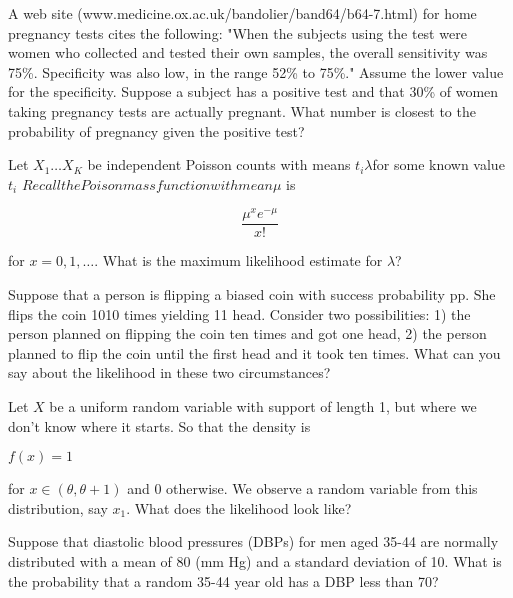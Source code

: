 \documentclass{homework}
\begin{document}
\begin{tcolorbox}[title=Question 3]
A web site (www.medicine.ox.ac.uk/bandolier/band64/b64-7.html) for home pregnancy tests cites the following: "When the subjects using the test were women who collected and tested their own samples, the overall sensitivity was 75\%. Specificity was also low, in the range 52\% to 75\%." Assume the lower value for the specificity. Suppose a subject has a positive test and that 30\% of women taking pregnancy tests are actually pregnant. What number is closest to the probability of pregnancy given the positive test?
\end{tcolorbox}

\begin{tcolorbox}[title=Question 4]
Let $X_1\ldots X_K$ be independent Poisson counts with means $t_i \lambda$for some known value $t_i$ $Recall the Poison mass function with mean \mu$ is

$$
 \frac{\mu^x e^{-\mu}}{x!}  
$$

for $x = 0,1,\ldots$. What is the maximum likelihood estimate for $\lambda$?
\end{tcolorbox}

\begin{tcolorbox}[title=Question 5]
Suppose that a person is flipping  a biased coin with success probability pp. She flips the coin 1010 times yielding 11 head. Consider two possibilities: 1) the person planned on flipping the coin ten times and got one head, 2) the person planned to flip the coin until the first head and it took ten times. What can you say about the likelihood in these two circumstances?
\end{tcolorbox}

\begin{tcolorbox}[title=Question 6]
Let $X$ be a uniform random variable with support of length 1, but where we don't know where it starts. So that the density is

$ f(x) = 1$  

for $x \in (\theta, \theta + 1)$ and $0$ otherwise. We observe a random variable from this distribution, say $x_1$. What does the likelihood look like?
\end{tcolorbox}

\begin{tcolorbox}[title=Question 7]
Suppose that diastolic blood pressures (DBPs) for men aged 35-44 are normally distributed with a mean of 80 (mm Hg) and a standard deviation of 10. What is the probability that a random 35-44 year old has a  DBP less than 70?
\end{tcolorbox}
\end{document}

